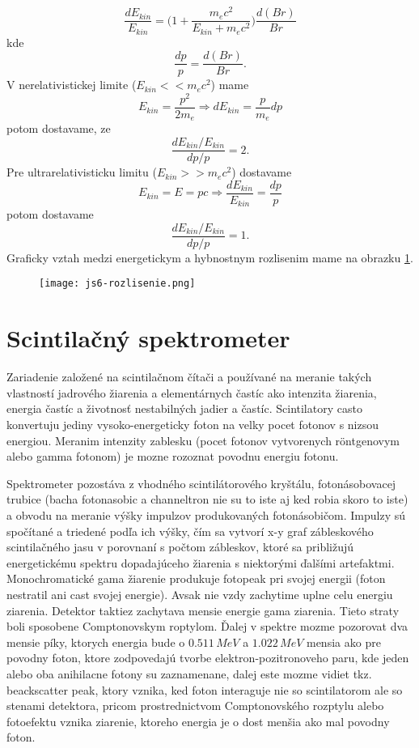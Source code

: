 \documentclass[../../main.tex]{subfiles}
\begin{document}
$$ \frac{dE_{kin}}{E_{kin}}=\bigg( 1+\frac{m_ec^2}{E_{kin}+m_ec^2}\bigg)\frac{d(Br)}{Br} $$ kde $$ \frac{dp}{p}=\frac{d(Br)}{Br}.$$
V nerelativistickej limite ($E_{kin} << m_ec^2$) mame $$ E_{kin}=\frac{p^2}{2m_e} \Rightarrow dE_{kin}=\frac{p}{m_e}dp $$
potom dostavame, ze $$ \frac{dE_{kin}/E_{kin}}{dp/p}=2.$$
Pre ultrarelativisticku limitu ($E_{kin} >> m_ec^2$) dostavame $$ E_{kin}=E=pc \Rightarrow \frac{dE_{kin}}{E_{kin}}=\frac{dp}{p} $$ potom dostavame $$ \frac{dE_{kin}/E_{kin}}{dp/p}=1.$$
Graficky vztah medzi energetickym a hybnostnym rozlisenim mame na obrazku \ref{js6:fig:rozslisenie}.
\begin{figure}[!h]
\centering
\texttt{[image: js6-rozlisenie.png]}
\caption{}
\label{js6:fig:rozslisenie}
\end{figure}

\section{Scintilačný spektrometer}
Zariadenie založené na scintilačnom čítači a používané na meranie takých vlastností jadrového žiarenia a elementárnych častíc ako intenzita žiarenia, energia častíc a životnosť nestabilných jadier a častíc.
Scintilatory casto konvertuju jediny vysoko-energeticky foton na velky pocet fotonov s nizsou energiou. Meranim intenzity zablesku (pocet fotonov vytvorenych r\"{o}ntgenovym alebo gamma fotonom) je mozne rozoznat povodnu energiu fotonu.\par
Spektrometer pozostáva z vhodného scintilátorového kryštálu, fotonásobovacej trubice (bacha fotonasobic a channeltron nie su to iste aj ked robia skoro to iste) a obvodu na meranie výšky impulzov produkovaných fotonásobičom. Impulzy sú spočítané a triedené podľa ich výšky, čím sa vytvorí x-y graf zábleskového scintilačného jasu v porovnaní s počtom zábleskov, ktoré sa približujú energetickému spektru dopadajúceho žiarenia s niektorými ďalšími artefaktmi. Monochromatické gama žiarenie produkuje fotopeak pri svojej energii (foton nestratil ani cast svojej energie). Avsak nie vzdy zachytime uplne celu energiu ziarenia. Detektor taktiez zachytava mensie energie gama ziarenia. Tieto straty boli sposobene Comptonovskym roptylom. Ďalej v spektre mozme pozorovat dva mensie píky, ktorych energia bude o $0.511\,MeV$ a $1.022\,MeV$ mensia ako pre povodny foton, ktore zodpovedajú tvorbe elektron-pozitronoveho paru, kde jeden alebo oba anihilacne fotony su zaznamenane, dalej este mozme vidiet tkz. beackscatter peak, ktory vznika, ked foton interaguje nie so scintilatorom ale so stenami detektora, pricom prostrednictvom Comptonovského rozptylu alebo fotoefektu vznika ziarenie, ktoreho energia je o dost menšia ako mal povodny foton.\par
\end{document}
